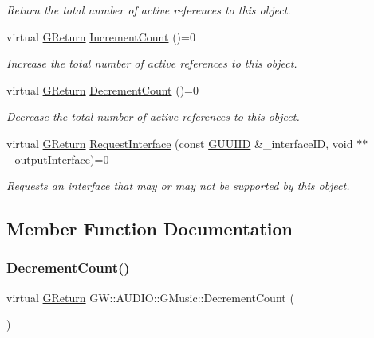 \begin{DoxyCompactItemize}
\begin{DoxyCompactList}\small\item\em Return the total number of active references to this object. \end{DoxyCompactList}\item 
virtual \hyperlink{namespaceGW_a67a839e3df7ea8a5c5686613a7a3de21}{G\+Return} \hyperlink{classGW_1_1AUDIO_1_1GMusic_a22d7a170b4d307e5398ebb92f950431f}{Increment\+Count} ()=0
\begin{DoxyCompactList}\small\item\em Increase the total number of active references to this object. \end{DoxyCompactList}\item 
virtual \hyperlink{namespaceGW_a67a839e3df7ea8a5c5686613a7a3de21}{G\+Return} \hyperlink{classGW_1_1AUDIO_1_1GMusic_a1385376fffc42c40f5922b4722d10b5c}{Decrement\+Count} ()=0
\begin{DoxyCompactList}\small\item\em Decrease the total number of active references to this object. \end{DoxyCompactList}\item 
virtual \hyperlink{namespaceGW_a67a839e3df7ea8a5c5686613a7a3de21}{G\+Return} \hyperlink{classGW_1_1AUDIO_1_1GMusic_a45b07d7915cfe61ab27338c42b78dcfb}{Request\+Interface} (const \hyperlink{structGW_1_1GUUIID}{G\+U\+U\+I\+ID} \&\+\_\+interface\+ID, void $\ast$$\ast$\+\_\+output\+Interface)=0
\begin{DoxyCompactList}\small\item\em Requests an interface that may or may not be supported by this object. \end{DoxyCompactList}\end{DoxyCompactItemize}


\subsection{Member Function Documentation}
\mbox{\label{classGW_1_1AUDIO_1_1GMusic_a1385376fffc42c40f5922b4722d10b5c}} 
\subsubsection{\texorpdfstring{Decrement\+Count()}{DecrementCount()}}
{\footnotesize\ttfamily virtual \hyperlink{namespaceGW_a67a839e3df7ea8a5c5686613a7a3de21}{G\+Return} G\+W\+::\+A\+U\+D\+I\+O\+::\+G\+Music\+::\+Decrement\+Count (\begin{DoxyParamCaption}{ }\end{DoxyParamCaption})\hspace{0.3cm}{\ttfamily [pure virtual]}}



